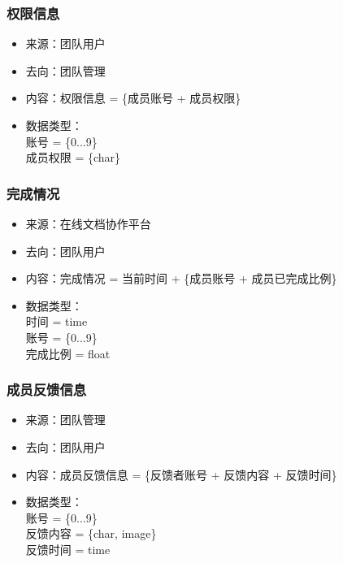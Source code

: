             \subsubsection{权限信息}
            \begin{itemize}
                \item 来源：团队用户
                \item 去向：团队管理
                \item 内容：权限信息 = \{成员账号 + 成员权限\}
                \item 数据类型：\\
                账号 = \{0...9\} \\
                成员权限 = \{char\} \\
            \end{itemize}
            \subsubsection{完成情况}
            \begin{itemize}
                \item 来源：在线文档协作平台
                \item 去向：团队用户
                \item 内容：完成情况 = 当前时间 + \{成员账号 + 成员已完成比例\}
                \item 数据类型：\\
                时间 = time \\
                账号 = \{0...9\} \\
                完成比例 = float \\
            \end{itemize}
            \subsubsection{成员反馈信息}
            \begin{itemize}
                \item 来源：团队管理
                \item 去向：团队用户
                \item 内容：成员反馈信息 = \{反馈者账号 + 反馈内容 + 反馈时间\}
                \item 数据类型：\\
                账号 = \{0...9\} \\
                反馈内容 = \{char, image\} \\
                反馈时间 = time\\
            \end{itemize}
